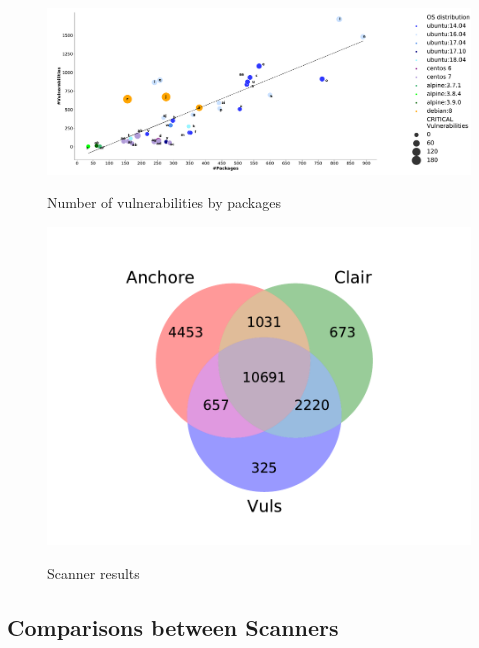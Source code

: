 \documentclass[a4paper,num-refs]{oup-contemporary}
\begin{document}
\begin{figure}[!ht]
        {\includegraphics[scale=1.5,width=\textwidth]
        {Figures/vulngraph.pdf}}
        \caption{\label{fig:graph1} Number of vulnerabilities by packages}
      \end{figure}

\begin{figure}[!ht]
        {\includegraphics[scale=2.5,width=\columnwidth]
        {Figures/venn.pdf}}
        \caption{\label{fig:venn} Scanner results}
\end{figure}


\subsection{Comparisons between Scanners}
\end{document}
